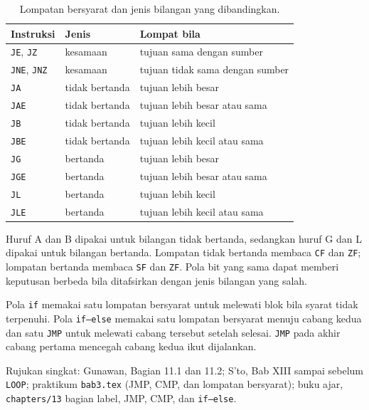 \begin{table}[H]
    \centering
    \caption{Lompatan bersyarat dan jenis bilangan yang dibandingkan.}
    \label{tab:m04-jcc}
    \small
    \begin{tabular}{@{}lll@{}}
        \toprule
        \textbf{Instruksi} & \textbf{Jenis} & \textbf{Lompat bila} \\
        \midrule
        \texttt{JE}, \texttt{JZ} & kesamaan & tujuan sama dengan sumber \\
        \texttt{JNE}, \texttt{JNZ} & kesamaan & tujuan tidak sama dengan sumber \\
        \texttt{JA} & tidak bertanda & tujuan lebih besar \\
        \texttt{JAE} & tidak bertanda & tujuan lebih besar atau sama \\
        \texttt{JB} & tidak bertanda & tujuan lebih kecil \\
        \texttt{JBE} & tidak bertanda & tujuan lebih kecil atau sama \\
        \texttt{JG} & bertanda & tujuan lebih besar \\
        \texttt{JGE} & bertanda & tujuan lebih besar atau sama \\
        \texttt{JL} & bertanda & tujuan lebih kecil \\
        \texttt{JLE} & bertanda & tujuan lebih kecil atau sama \\
        \bottomrule
    \end{tabular}
\end{table}

Huruf A dan B dipakai untuk bilangan tidak bertanda, sedangkan huruf
G dan L dipakai untuk bilangan bertanda. Lompatan tidak bertanda
membaca \texttt{CF} dan \texttt{ZF}; lompatan bertanda membaca
\texttt{SF} dan \texttt{ZF}. Pola bit yang sama dapat memberi
keputusan berbeda bila ditafsirkan dengan jenis bilangan yang salah.

Pola \texttt{if} memakai satu lompatan bersyarat untuk melewati blok
bila syarat tidak terpenuhi. Pola \texttt{if--else} memakai satu
lompatan bersyarat menuju cabang kedua dan satu \texttt{JMP} untuk
melewati cabang tersebut setelah selesai. \texttt{JMP} pada akhir
cabang pertama mencegah cabang kedua ikut dijalankan.

\begin{rujukan}
Rujukan singkat: Gunawan, Bagian 11.1 dan 11.2; S'to, Bab XIII sampai
sebelum \texttt{LOOP}; praktikum \texttt{bab3.tex} (JMP, CMP, dan
lompatan bersyarat); buku ajar, \texttt{chapters/13} bagian label,
JMP, CMP, dan \texttt{if--else}.
\end{rujukan}

